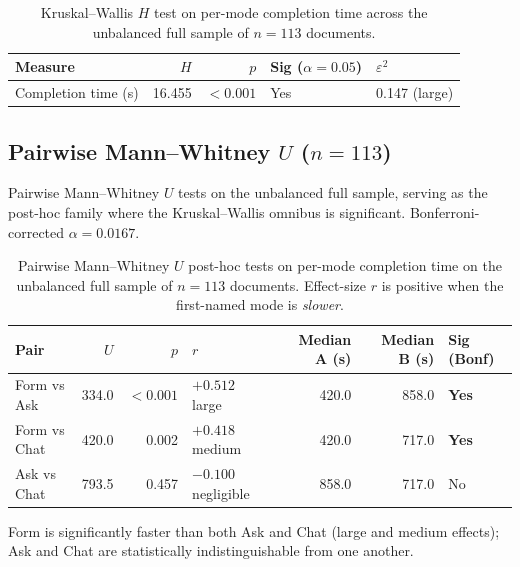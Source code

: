 \begin{table}[htbp]
\centering
\caption{Kruskal--Wallis $H$ test on per-mode completion time
across the unbalanced full sample of $n = 113$ documents.}
\label{tab:app-timing-kw}
\small
\begin{tabular}{@{}l r r l l@{}}
\toprule
Measure & $H$ & $p$ & Sig ($\alpha = 0.05$) & $\varepsilon^2$ \\
\midrule
Completion time (s) & 16.455 & $<0.001$ & Yes & 0.147 (large) \\
\bottomrule
\end{tabular}
\end{table}

\subsection{Pairwise Mann--Whitney $U$ ($n = 113$)}

Pairwise Mann--Whitney $U$ tests on the unbalanced full sample,
serving as the post-hoc family where the Kruskal--Wallis omnibus
is significant. Bonferroni-corrected $\alpha = 0.0167$.

\begin{table}[htbp]
\centering
\caption{Pairwise Mann--Whitney $U$ post-hoc tests on per-mode
completion time on the unbalanced full sample of $n = 113$
documents. Effect-size $r$ is positive when the first-named mode
is \emph{slower}.}
\label{tab:app-timing-mwu}
\small
\begin{tabular}{@{}l r r l r r l@{}}
\toprule
Pair & $U$ & $p$ & $r$ & Median A (s) & Median B (s) & Sig (Bonf) \\
\midrule
Form vs Ask  & 334.0 & $<0.001$ & $+0.512$ large       & 420.0 & 858.0 & \textbf{Yes} \\
Form vs Chat & 420.0 & 0.002    & $+0.418$ medium      & 420.0 & 717.0 & \textbf{Yes} \\
Ask vs Chat  & 793.5 & 0.457    & $-0.100$ negligible  & 858.0 & 717.0 & No \\
\bottomrule
\end{tabular}
\end{table}

Form is significantly faster than both Ask and Chat (large and
medium effects); Ask and Chat are statistically indistinguishable
from one another.
